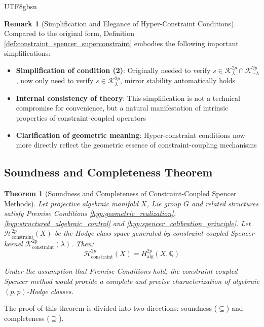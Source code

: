 \documentclass[a4paper,12pt]{extarticle}
\newtheorem{theorem}{Theorem}[section]
\theoremstyle{definition}
\newtheorem{remark}{Remark}[section]
\begin{document}
\begin{CJK}{UTF8}{gbsn}
\begin{remark}[Simplification and Elegance of Hyper-Constraint Conditions]
Compared to the original form, Definition \ref{def:constraint_spencer_superconstraint} embodies the following important simplifications:
\begin{itemize}
    \item \textbf{Simplification of condition (2)}: Originally needed to verify $s \in \mathcal{K}^{2p}_\lambda \cap \mathcal{K}^{2p}_{-\lambda}$, now only need to verify $s \in \mathcal{K}^{2p}_\lambda$, mirror stability automatically holds
    \item \textbf{Internal consistency of theory}: This simplification is not a technical compromise for convenience, but a natural manifestation of intrinsic properties of constraint-coupled operators
    \item \textbf{Clarification of geometric meaning}: Hyper-constraint conditions now more directly reflect the geometric essence of constraint-coupling mechanisms
\end{itemize}
\end{remark}

\subsection{Soundness and Completeness Theorem}
\label{subsec:soundness_completeness_theorem}

\begin{theorem}[Soundness and Completeness of Constraint-Coupled Spencer Methods]
\label{thm:constraint_spencer_soundness_completeness}
Let projective algebraic manifold $X$, Lie group $G$ and related structures satisfy Premise Conditions \ref{hyp:geometric_realization}, \ref{hyp:structured_algebraic_control} and \ref{hyp:spencer_calibration_principle}. Let $\mathcal{H}_{\text{constraint}}^{2p}(X)$ be the Hodge class space generated by constraint-coupled Spencer kernel $\mathcal{K}^{2p}_{\text{constraint}}(\lambda)$. Then:
\begin{equation}
\label{eq:complete_characterization}
\mathcal{H}_{\text{constraint}}^{2p}(X) = H_{\text{alg}}^{2p}(X, \mathbb{Q})
\end{equation}

Under the assumption that Premise Conditions hold, the constraint-coupled Spencer method would provide a complete and precise characterization of algebraic $(p,p)$-Hodge classes.
\end{theorem}

The proof of this theorem is divided into two directions: soundness ($\subseteq$) and completeness ($\supseteq$).


\end{CJK}
\end{document}
